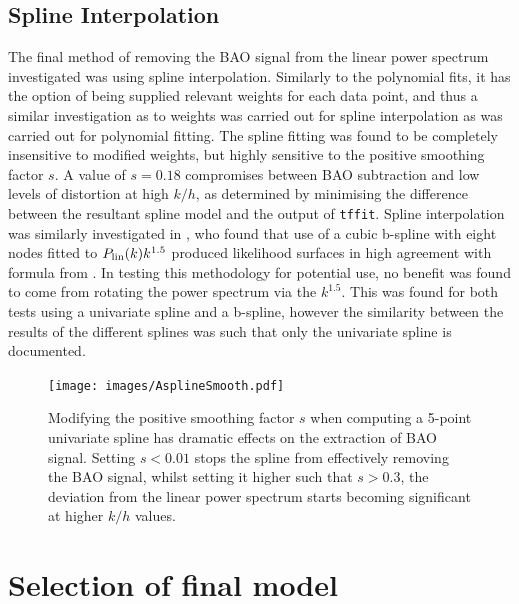 \documentclass[titlesmallcaps, examinerscopy, copyrightpage]{uqthesis}
\begin{document}
\begin{appendices}
\subsection{Spline Interpolation}


The final method of removing the BAO signal from the linear power spectrum investigated was using spline interpolation. Similarly to the polynomial fits, it has the option of being supplied relevant weights for each data point, and thus a similar investigation as to weights was carried out for spline interpolation as was carried out for polynomial fitting. The spline fitting was found to be completely insensitive to modified weights, but highly sensitive to the positive smoothing factor $s$. A value of $s = 0.18$ compromises between BAO subtraction and low levels of distortion at high $k/h$, as determined by minimising the difference between the resultant spline model and the output of \verb;tffit;. Spline interpolation was similarly investigated in \citet{ReidPercival2010}, who found that use of a cubic b-spline with eight nodes fitted to $P_{\rm{lin}}(k) k^{1.5}$ produced likelihood surfaces in high agreement with formula from \citet{EisensteinHu1998}. In testing this methodology for potential use, no benefit was found to come from rotating the power spectrum via the $k^{1.5}$. This was found for both tests using a univariate spline and a b-spline, however the similarity between the results of the different splines was such that only the univariate spline is documented.


\begin{figure}[h!]
  \begin{center}
    \texttt{[image: images/AsplineSmooth.pdf]}
  	\caption{Modifying the positive smoothing factor $s$ when computing a 5-point univariate spline has dramatic effects on the extraction of BAO signal. Setting $s < 0.01$ stops the spline from effectively removing the BAO signal, whilst setting it higher such that $s > 0.3$, the deviation from the linear power spectrum starts becoming significant at higher $k/h$ values.}
  	\label{fig:AsplineSmooth}
  \end{center}
\end{figure}

\section{Selection of final model}


\end{appendices}
\end{document}
